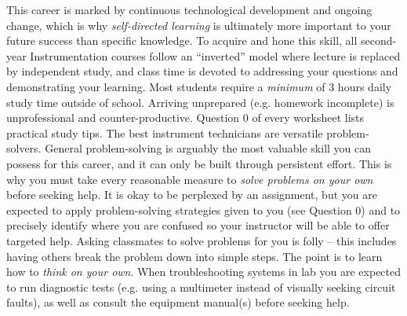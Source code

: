 \noindent
{} This career is marked by continuous technological development and ongoing change, which is why {\it self-directed learning} is ultimately more important to your future success than specific knowledge.  To acquire and hone this skill, all second-year Instrumentation courses follow an ``inverted'' model where lecture is replaced by independent study, and class time is devoted to addressing your questions and demonstrating your learning.  Most students require a {\it minimum} of 3 hours daily study time outside of school.  Arriving unprepared (e.g. homework incomplete) is unprofessional and counter-productive.  Question 0 of every worksheet lists practical study tips.
\vskip 10pt
\noindent
{} The best instrument technicians are versatile problem-solvers.  General problem-solving is arguably the most valuable skill you can possess for this career, and it can only be built through persistent effort.  This is why you must take every reasonable measure to {\it solve problems on your own} before seeking help.  It is okay to be perplexed by an assignment, but you are expected to apply problem-solving strategies given to you (see Question 0) and to precisely identify where you are confused so your instructor will be able to offer targeted help.  Asking classmates to solve problems for you is folly -- this includes having others break the problem down into simple steps.  The point is to learn how to {\it think on your own}.  When troubleshooting systems in lab you are expected to run diagnostic tests (e.g. using a multimeter instead of visually seeking circuit faults), as well as consult the equipment manual(s) before seeking help.  
\vskip 10pt
\eject

